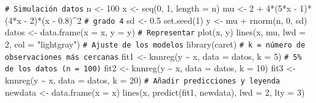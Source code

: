 \documentclass[
]{book}
\newenvironment{Shaded}{\begin{snugshade}}{\end{snugshade}}
\newcommand{\AttributeTok}[1]{\textcolor[rgb]{0.77,0.63,0.00}{#1}}
\newcommand{\CommentTok}[1]{\textcolor[rgb]{0.56,0.35,0.01}{\textit{#1}}}
\newcommand{\DecValTok}[1]{\textcolor[rgb]{0.00,0.00,0.81}{#1}}
\newcommand{\FloatTok}[1]{\textcolor[rgb]{0.00,0.00,0.81}{#1}}
\newcommand{\FunctionTok}[1]{\textcolor[rgb]{0.00,0.00,0.00}{#1}}
\newcommand{\NormalTok}[1]{#1}
\newcommand{\OtherTok}[1]{\textcolor[rgb]{0.56,0.35,0.01}{#1}}
\newcommand{\SpecialCharTok}[1]{\textcolor[rgb]{0.00,0.00,0.00}{#1}}
\newcommand{\StringTok}[1]{\textcolor[rgb]{0.31,0.60,0.02}{#1}}
\theoremstyle{break}
\theoremstyle{nonumberplain}
\renewcommand{\CommentTok}[1]{\textcolor[rgb]{0.41,0.41,0.41}{\texttt{#1}}}
\begin{document}
\begin{Shaded}
\begin{Highlighting}[]
\CommentTok{\# Simulación datos}
\NormalTok{n }\OtherTok{\textless{}{-}} \DecValTok{100}
\NormalTok{x }\OtherTok{\textless{}{-}} \FunctionTok{seq}\NormalTok{(}\DecValTok{0}\NormalTok{, }\DecValTok{1}\NormalTok{, }\AttributeTok{length =}\NormalTok{ n)}
\NormalTok{mu }\OtherTok{\textless{}{-}} \DecValTok{2} \SpecialCharTok{+} \DecValTok{4}\SpecialCharTok{*}\NormalTok{(}\DecValTok{5}\SpecialCharTok{*}\NormalTok{x }\SpecialCharTok{{-}} \DecValTok{1}\NormalTok{)}\SpecialCharTok{*}\NormalTok{(}\DecValTok{4}\SpecialCharTok{*}\NormalTok{x }\SpecialCharTok{{-}} \DecValTok{2}\NormalTok{)}\SpecialCharTok{*}\NormalTok{(x }\SpecialCharTok{{-}} \FloatTok{0.8}\NormalTok{)}\SpecialCharTok{\^{}}\DecValTok{2} \CommentTok{\# grado 4}
\NormalTok{sd }\OtherTok{\textless{}{-}} \FloatTok{0.5}
\FunctionTok{set.seed}\NormalTok{(}\DecValTok{1}\NormalTok{)}
\NormalTok{y }\OtherTok{\textless{}{-}}\NormalTok{ mu }\SpecialCharTok{+} \FunctionTok{rnorm}\NormalTok{(n, }\DecValTok{0}\NormalTok{, sd)}
\NormalTok{datos }\OtherTok{\textless{}{-}} \FunctionTok{data.frame}\NormalTok{(}\AttributeTok{x =}\NormalTok{ x, }\AttributeTok{y =}\NormalTok{ y)}
\CommentTok{\# Representar}
\FunctionTok{plot}\NormalTok{(x, y)}
\FunctionTok{lines}\NormalTok{(x, mu, }\AttributeTok{lwd =} \DecValTok{2}\NormalTok{, }\AttributeTok{col =} \StringTok{"lightgray"}\NormalTok{)}
\CommentTok{\# Ajuste de los modelos}
\FunctionTok{library}\NormalTok{(caret)}
\CommentTok{\# k = número de observaciones más cercanas}
\NormalTok{fit1 }\OtherTok{\textless{}{-}} \FunctionTok{knnreg}\NormalTok{(y }\SpecialCharTok{\textasciitilde{}}\NormalTok{ x, }\AttributeTok{data =}\NormalTok{ datos, }\AttributeTok{k =} \DecValTok{5}\NormalTok{) }\CommentTok{\# 5\% de los datos (n = 100)}
\NormalTok{fit2 }\OtherTok{\textless{}{-}} \FunctionTok{knnreg}\NormalTok{(y }\SpecialCharTok{\textasciitilde{}}\NormalTok{ x, }\AttributeTok{data =}\NormalTok{ datos, }\AttributeTok{k =} \DecValTok{10}\NormalTok{)}
\NormalTok{fit3 }\OtherTok{\textless{}{-}} \FunctionTok{knnreg}\NormalTok{(y }\SpecialCharTok{\textasciitilde{}}\NormalTok{ x, }\AttributeTok{data =}\NormalTok{ datos, }\AttributeTok{k =} \DecValTok{20}\NormalTok{)}
\CommentTok{\# Añadir predicciones y leyenda}
\NormalTok{newdata }\OtherTok{\textless{}{-}} \FunctionTok{data.frame}\NormalTok{(}\AttributeTok{x =}\NormalTok{ x)}
\FunctionTok{lines}\NormalTok{(x, }\FunctionTok{predict}\NormalTok{(fit1, newdata), }\AttributeTok{lwd =} \DecValTok{2}\NormalTok{, }\AttributeTok{lty =} \DecValTok{3}\NormalTok{)}

\end{Highlighting}
\end{Shaded}
\end{document}
